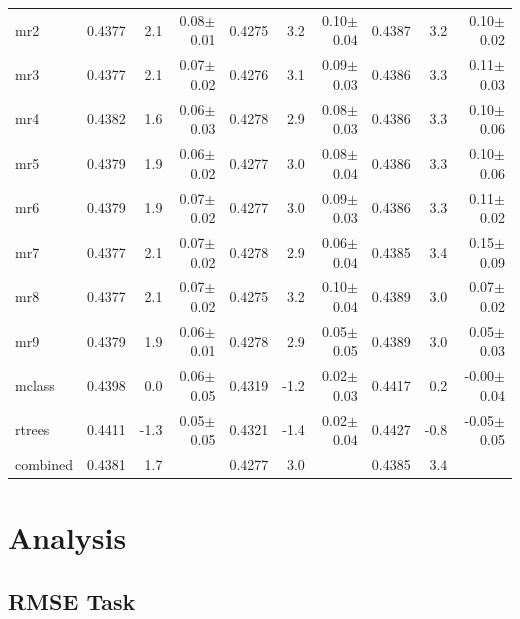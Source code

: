 \documentclass{article}
\begin{document}
\begin{table}[b]
\begin{center}
\begin{small}
\begin{sc}
\begin{tabular}{l|rr r|rr r|rr r}
mr2        & 0.4377 &   2.1 &  0.08$\pm$0.01& 0.4275 &   3.2 &  0.10$\pm$0.04& 0.4387 &   3.2 &  0.10$\pm$0.02 \\ 
mr3        & 0.4377 &   2.1 &  0.07$\pm$0.02& 0.4276 &   3.1 &  0.09$\pm$0.03& 0.4386 &   3.3 &  0.11$\pm$0.03 \\ 
mr4        & 0.4382 &   1.6 &  0.06$\pm$0.03& 0.4278 &   2.9 &  0.08$\pm$0.03& 0.4386 &   3.3 &  0.10$\pm$0.06 \\ 
mr5        & 0.4379 &   1.9 &  0.06$\pm$0.02& 0.4277 &   3.0 &  0.08$\pm$0.04& 0.4386 &   3.3 &  0.10$\pm$0.06 \\ 
mr6        & 0.4379 &   1.9 &  0.07$\pm$0.02& 0.4277 &   3.0 &  0.09$\pm$0.03& 0.4386 &   3.3 &  0.11$\pm$0.02 \\ 
mr7        & 0.4377 &   2.1 &  0.07$\pm$0.02& 0.4278 &   2.9 &  0.06$\pm$0.04& 0.4385 &   3.4 &  0.15$\pm$0.09 \\ 
mr8        & 0.4377 &   2.1 &  0.07$\pm$0.02& 0.4275 &   3.2 &  0.10$\pm$0.04& 0.4389 &   3.0 &  0.07$\pm$0.02 \\ 
mr9        & 0.4379 &   1.9 &  0.06$\pm$0.01& 0.4278 &   2.9 &  0.05$\pm$0.05& 0.4389 &   3.0 &  0.05$\pm$0.03 \\ 
\abovespace
mclass     & 0.4398 &   0.0 &  0.06$\pm$0.05& 0.4319 &  -1.2 &  0.02$\pm$0.03& 0.4417 &   0.2 & -0.00$\pm$0.04 \\ 
rtrees     & 0.4411 &  -1.3 &  0.05$\pm$0.05& 0.4321 &  -1.4 &  0.02$\pm$0.04& 0.4427 &  -0.8 & -0.05$\pm$0.05 \\ 
\abovespace\belowspace
combined   & 0.4381 &   1.7 &  & 0.4277 &   3.0 &  & 0.4385 &   3.4 &   \\ 
\hline
\end{tabular}
\end{sc}
\end{small}
\end{center}
\vskip -0.1in
\end{table}

\section{Analysis}

\subsection{RMSE Task}
\end{document}
